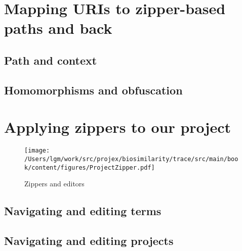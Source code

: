\section{Mapping URIs to zipper-based paths and back}

\subsection{Path and context}

\subsection{Homomorphisms and obfuscation}

\section{Applying zippers to our project}

\begin{figure}[tbp]
\begin{center}
{ \texttt{[image: /Users/lgm/work/src/projex/biosimilarity/trace/src/main/book/content/figures/ProjectZipper.pdf]} }
\caption{ Zippers and editors }
\end{center}
\end{figure}
\subsection{Navigating and editing terms}

\subsection{Navigating and editing projects}
